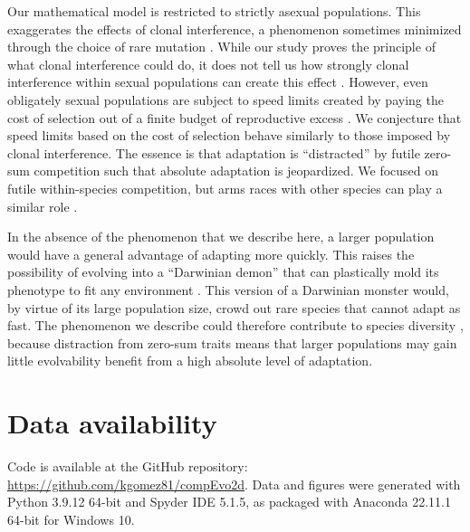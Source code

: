 \documentclass[9pt,twocolumn,twoside,lineno]{gsajnl}
\begin{document}
Our mathematical model is restricted to strictly asexual populations. This exaggerates the effects of clonal interference, a phenomenon sometimes minimized through the choice of rare mutation \citep{OsmondDeMazancourt2013}. While our study proves the principle of what clonal interference could do, it does not tell us how strongly clonal interference within sexual populations can create this effect \citep{neher2010rate,weissman2014rate}. However, even obligately sexual populations are subject to speed limits created by paying the cost of selection out of a finite budget of reproductive excess \citep{Matheson2025,haldane1957cost,Felsenstein1971,Nei1971}. We conjecture that speed limits based on the cost of selection behave similarly to those imposed by clonal interference. The essence is that adaptation is ``distracted'' by futile zero-sum competition such that absolute adaptation is jeopardized. We focused on futile within-species competition, but arms races with other species can play a similar role \citep{Scanlan2015,Harrison2017,DawkinsKrebs1979, ScottQueller2019}. 

In the absence of the phenomenon that we describe here, a larger population would have a general advantage of adapting more quickly. This raises the possibility of evolving into a ``Darwinian demon'' that can plastically mold its phenotype to fit any environment \citep{pigliucci2001phenotypic}. This version of a Darwinian monster would, by virtue of its large population size, crowd out rare species that cannot adapt as fast. The phenomenon we describe could therefore contribute to species diversity \citep{ScottQueller2019}, because distraction from zero-sum traits means that larger populations may gain little evolvability benefit from a high absolute level of adaptation.
 

\section{Data availability}
Code is available at the GitHub repository: \\
\href{https://github.com/kgomez81/compEvo2d}{https://github.com/kgomez81/compEvo2d}. Data and figures were generated with Python 3.9.12 64-bit and Spyder IDE 5.1.5, as packaged with Anaconda 22.11.1 64-bit for Windows 10.

\end{document}
